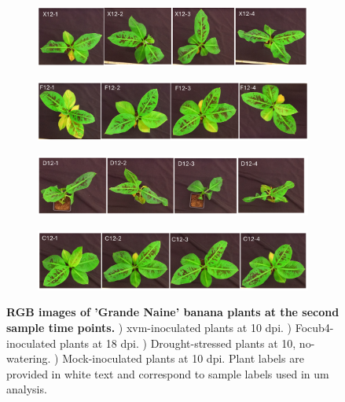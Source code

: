 \begin{figure}[ph!]
  \centering
  \begin{subfigure}[b]{\textwidth}
    \includegraphics[width=\textwidth]{Figures/SecondTimePointXanthomonasBLQs.pdf}
    \caption{}
    \label{fig:XvmSecondTimeBLQs}
  \end{subfigure}
   \begin{subfigure}[b]{\textwidth}
    \includegraphics[width=\textwidth]{Figures/SecondTimePointFusariumBLQs.pdf}
    \caption{}
    \label{fig:FocSecondTimeBLQs}
  \end{subfigure}
     \begin{subfigure}[b]{\textwidth}
    \includegraphics[width=\textwidth]{Figures/SecondTimePointDroughtBLQs.pdf}
    \caption{}
    \label{fig:DroSecondTimeBLQs}
  \end{subfigure}
     \begin{subfigure}[b]{\textwidth}
    \includegraphics[width=\textwidth]{Figures/SecondTimePointControlBLQs.pdf}
    \caption{}
    \label{fig:ConSecondTimeBLQs}
  \end{subfigure}
  \caption[RGB images of 'Grande Naine' banana plants at the second sample time points.]{\textbf{RGB images of 'Grande Naine' banana plants at the second sample time points.}
  \textbf{}) \acl{xvm}-inoculated plants at 10 \acl{dpi}.
  \textbf{}) \acl{Focub4}-inoculated plants at 18 \acl{dpi}.
  \textbf{}) Drought-stressed plants at 10, no-watering.
  \textbf{}) Mock-inoculated plants at 10 \ac{dpi}.
  Plant labels are provided in white text and correspond to sample labels used in \acl{um} analysis.
  }
  \label{fig:SecondTimePointSymptoms}
\end{figure}

